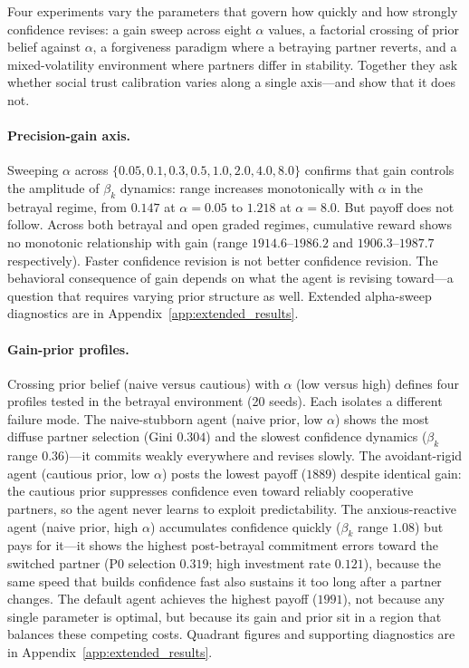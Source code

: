 Four experiments vary the parameters that govern how quickly and how strongly confidence revises: a gain sweep across eight $\alpha$ values, a factorial crossing of prior belief against $\alpha$, a forgiveness paradigm where a betraying partner reverts, and a mixed-volatility environment where partners differ in stability. Together they ask whether social trust calibration varies along a single axis---and show that it does not.

\paragraph{Precision-gain axis.}
Sweeping $\alpha$ across $\{0.05, 0.1, 0.3, 0.5, 1.0, 2.0, 4.0, 8.0\}$ confirms that gain controls the amplitude of $\beta_k$ dynamics: range increases monotonically with $\alpha$ in the betrayal regime, from $0.147$ at $\alpha = 0.05$ to $1.218$ at $\alpha = 8.0$. But payoff does not follow. Across both betrayal and open graded regimes, cumulative reward shows no monotonic relationship with gain (range $1914.6$--$1986.2$ and $1906.3$--$1987.7$ respectively). Faster confidence revision is not better confidence revision. The behavioral consequence of gain depends on what the agent is revising toward---a question that requires varying prior structure as well. Extended alpha-sweep diagnostics are in Appendix~\ref{app:extended_results}.

\paragraph{Gain-prior profiles.}
Crossing prior belief (naive versus cautious) with $\alpha$ (low versus high) defines four profiles tested in the betrayal environment (20 seeds). Each isolates a different failure mode. The naive-stubborn agent (naive prior, low $\alpha$) shows the most diffuse partner selection (Gini $0.304$) and the slowest confidence dynamics ($\beta_k$ range $0.36$)---it commits weakly everywhere and revises slowly. The avoidant-rigid agent (cautious prior, low $\alpha$) posts the lowest payoff ($1889$) despite identical gain: the cautious prior suppresses confidence even toward reliably cooperative partners, so the agent never learns to exploit predictability. The anxious-reactive agent (naive prior, high $\alpha$) accumulates confidence quickly ($\beta_k$ range $1.08$) but pays for it---it shows the highest post-betrayal commitment errors toward the switched partner (P0 selection $0.319$; high investment rate $0.121$), because the same speed that builds confidence fast also sustains it too long after a partner changes. The default agent achieves the highest payoff ($1991$), not because any single parameter is optimal, but because its gain and prior sit in a region that balances these competing costs. Quadrant figures and supporting diagnostics are in Appendix~\ref{app:extended_results}.

